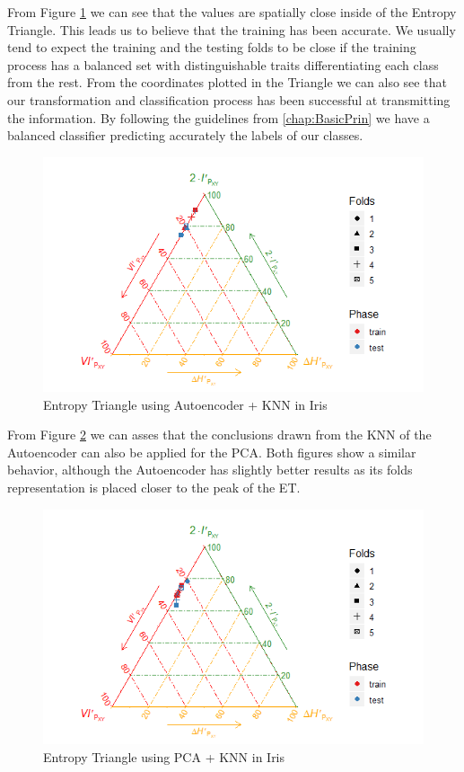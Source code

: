 From Figure \ref{fig:figure_Knn_Iris_ET_Auto} we can see that the values are spatially close inside of the Entropy Triangle. This leads us to believe that the training has been accurate. We usually tend to expect the training and the testing folds to be close if the training process has a balanced set with distinguishable traits differentiating each class from the rest. From the coordinates plotted in the Triangle we can also see that our transformation and classification process has been successful at transmitting the information. By following the guidelines from \ref{chap:BasicPrin} we have a balanced classifier predicting accurately the labels of our classes.  \par
\begin{figure}[H]
	\centering
	\includegraphics[width=\linewidth]{Figuras_tfg/ET_knn_iris_auto}
	\caption{Entropy Triangle using Autoencoder + KNN in Iris}
	\label{fig:figure_Knn_Iris_ET_Auto}
\end{figure}


From Figure \ref{fig:figure_Knn_Iris_ET_PCA} we can asses that the conclusions drawn from the KNN of the Autoencoder can also be applied for the PCA. Both figures show a similar behavior, although the Autoencoder has slightly better results as its folds representation is placed closer to the peak of the ET. 
\begin{figure}[H]
	\centering
	\includegraphics[width=\linewidth]{Figuras_tfg/ET_knn_iris_pca}
	\caption{Entropy Triangle using PCA + KNN in Iris}
	\label{fig:figure_Knn_Iris_ET_PCA}
\end{figure}

